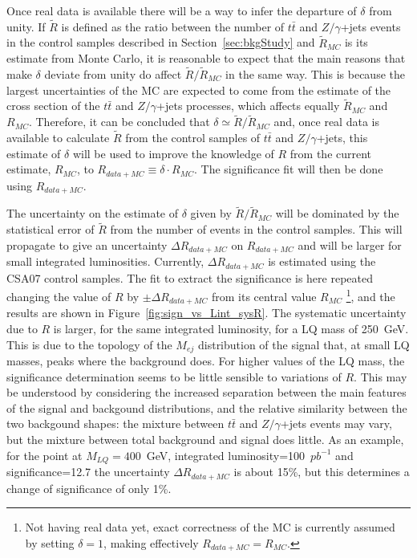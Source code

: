 \documentclass[colclass=cmspaper]{combine}
\begin{document}
\begin{linenumbers}
Once real data is available there will be a way to infer the departure of $\delta$ from unity.
If $\tilde{R}$ is defined as the ratio between the number of $t\bar{t}$ and $Z/\gamma$+jets events in the
control samples described in Section~\ref{sec:bkgStudy} and $\tilde{R}_{MC}$ is its
estimate from Monte Carlo, it is reasonable to expect that the main reasons that
make $\delta$ deviate from unity do affect $\tilde{R}/\tilde{R}_{MC}$ in the same way.
This is because the largest uncertainties of the MC are expected to come from the estimate 
of the cross section of the $t\bar{t}$ and $Z/\gamma$+jets processes, 
which affects equally $\tilde{R}_{MC}$ and $R_{MC}$.
Therefore, it can be concluded that $\delta \simeq \tilde{R}/\tilde{R}_{MC}$ and, once real data is available
to calculate $\tilde{R}$ from the control samples of $t\bar{t}$ and $Z/\gamma$+jets, this estimate 
of $\delta$ will be used to improve the knowledge of $R$ from the current estimate, $R_{MC}$, 
to $R_{data+MC} \equiv \delta \cdot R_{MC}$.
The significance fit will then be done using $R_{data+MC}$. 

The uncertainty on the estimate of $\delta$ given by $\tilde{R}/\tilde{R}_{MC}$ will be 
dominated by the statistical error of $\tilde{R}$ from the number of events in the control samples. 
This will propagate to give an uncertainty $\Delta R_{data+MC}$ on $R_{data+MC}$ and will
be larger for small integrated luminosities. 
Currently, $\Delta R_{data+MC}$ is estimated using the CSA07 control samples.
The fit to extract the significance is here repeated changing the value of $R$ by 
$\pm\Delta R_{data+MC}$ from its central value $R_{MC}$ \footnote{Not having real data yet, 
exact correctness of the MC is currently assumed by setting $\delta=1$, 
making effectively $R_{data+MC}=R_{MC}$.}, and the results are shown in 
Figure~\ref{fig:sign_vs_Lint_sysR}.
The systematic uncertainty due to $R$ is larger, for the same integrated luminosity, for a
LQ mass of 250~GeV. This is due to the topology of the $M_{ej}$ distribution 
of the signal that, at small LQ masses, peaks where the background does.
For higher values of the LQ mass, the significance determination seems to be little 
sensible to variations of $R$. This may be understood by considering the increased separation
between the main features of the signal and backgound distributions, and the relative similarity 
between the two backgound shapes: 
the mixture between $t\bar{t}$ and $Z/\gamma$+jets events may vary, but
the mixture between total background and signal does little.
As an example, for the point at $M_{LQ}=400$~GeV, integrated luminosity=100~$pb^{-1}$ and significance=12.7
the uncertainty  $\Delta R_{data+MC}$ is about 15\%, but this determines a change of 
significance of only 1\%.


\end{linenumbers}
\end{document}
